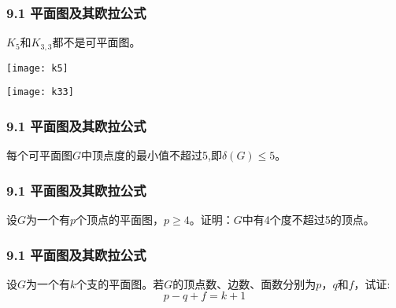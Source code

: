 \documentclass{beamer}
\begin{document}
\begin{CJK}{UTF8}{gbsn}
\begin{frame}

\end{frame}
\begin{frame}
  \frametitle{9.1 平面图及其欧拉公式}
  \begin{Cor}
    $K_5$和$K_{3,3}$都不是可平面图。
  \end{Cor}
\vspace{1cm}
  \begin{minipage}{0.45\linewidth}
\texttt{[image: k5]}    
  \end{minipage}
  \begin{minipage}{0.45\linewidth}
    \texttt{[image: k33]}
  \end{minipage}
\end{frame}
\begin{frame}
  \frametitle{9.1 平面图及其欧拉公式}
  \begin{Cor}
    每个可平面图$G$中顶点度的最小值不超过5,即$\delta (G) \leq 5$。
  \end{Cor}
\end{frame}
\begin{frame}
  \frametitle{9.1 平面图及其欧拉公式}
  \begin{Exercise}
    设$G$为一个有$p$个顶点的平面图，$p \geq 4$。证明：$G$中有4个度不超过5的顶点。
  \end{Exercise}
\end{frame}
\begin{frame}
  \frametitle{9.1 平面图及其欧拉公式}
  \begin{Exercise}
    设$G$为一个有$k$个支的平面图。若$G$的顶点数、边数、面数分别为$p$，$q$和$f$，试证:
    \begin{equation*}
      p - q + f = k + 1
    \end{equation*}
  \end{Exercise}
\end{frame}


\end{CJK}
\end{document}
